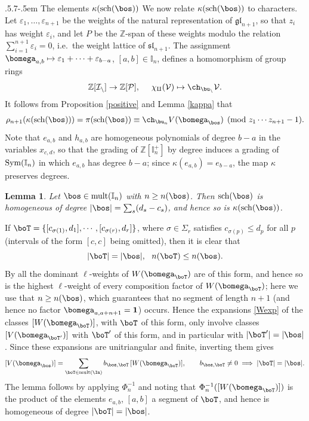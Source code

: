 \documentclass[11pt,reqno]{amsart}
\makeatletter
\newtheorem*{lem}{Lemma}
\theoremstyle{definition} \newtheorem*{defn}{Definition}
\theoremstyle{definition}
\newenvironment{pf}{\proof}{\endproof}
\numberwithin{equation}{section}
\newcommand{\lie}[1]{\mathfrak{#1}}
\def\subsection{\def\@secnumfont{\bfseries}\@startsection{subsection}{2}%
  {\parindent}{.5\linespacing\@plus.7\linespacing}{-.5em}%
  {\normalfont\bfseries}}
\def\mult{\operatorname{mult}}
\makeatother
\begin{document}
\subsection{The elements $\kappa({\rm sch}(\bos))$} We now relate $\kappa({\rm sch}(\bos))$ to characters. Let $\varepsilon_1,\dots,\varepsilon_{n+1}$ be the weights of the natural
representation of $\lie{gl}_{n+1}$, so that $z_i$ has weight $\varepsilon_i$, and let $P$ be the $\mathbb Z$-span of these weights
modulo the relation $\sum_{i=1}^{n+1}\varepsilon_i=0$, i.e.\ the weight lattice of $\lie{sl}_{n+1}$. The assignment
$\bomega_{a,b}\mapsto \varepsilon_1+\cdots+\varepsilon_{b-a}$, $[a,b]\in\mathbb I_n$, defines a
homomorphism of group rings $$\mathbb Z[\cal I_n]\to\mathbb Z[P], \ \ \ \ \chi_q(V)\mapsto 
\ch_{\bu_n}V.$$  It follows from Proposition \ref{positive} and Lemma
\ref{kappa} that
$$\rho_{n+1}(\kappa({\rm sch}(\bos)))=\pi({\rm sch}(\bos))\equiv\ch_{\bu_n}V(\bomega_\bos)\pmod{z_1\cdots z_{n+1}-1}.$$
\noindent Note that $e_{a,b}$ and $h_{a,b}$ are homogeneous polynomials of degree $b-a$ in the variables $x_{c,d}$, so that the
grading of $\mathbb Z[\mathbb I_n^+]$ by degree induces a grading of ${\rm Sym}(\mathbb I_n)$ in which $e_{a,b}$ has degree $b-a$; since
$\kappa(e_{a,b})=e_{b-a}$, the map $\kappa$ preserves degrees.
\begin{lem}\label{homog} Let $\bos\in{\rm mult}(\mathbb I_n)$ with $n\ge n(\bos)$. Then ${\rm sch}(\bos)$ is homogeneous of degree
$|\bos|=\sum_s(d_s-c_s)$, and hence so is $\kappa({\rm sch}(\bos))$.
\end{lem}
\begin{pf} If $\boT=\{[c_{\sigma(1)},d_1],\cdots,[c_{\sigma(r)},d_r]\}$, where $\sigma\in\Sigma_r$ satisfies $c_{\sigma(p)}\le d_p$ for all $p$ (intervals
of the form $[c,c]$ being omitted), then it is clear that $$|\boT|=|\bos|,\ \ n(\boT)\le n(\bos).$$
By \cite[Theorem 1(ii)]{BC25b} all the dominant $\ell$-weights of $W(\bomega_\boT)$ are of this form, and hence so is the
highest $\ell$-weight of every composition factor of $W(\bomega_\boT)$; here we use that $n\ge n(\bos)$, which guarantees that no
segment of length $n+1$ (and hence no factor $\bomega_{a,a+n+1}=\bold 1$) occurs. Hence the expansions \eqref{Wexp} of the
classes $[W(\bomega_\boT)]$, with $\boT$ of this form, only involve classes $[V(\bomega_{\boT'})]$ with $\boT'$ of this form, and in
particular with $|\boT'|=|\bos|$. Since these expansions are unitriangular and finite, inverting them gives
$$[V(\bomega_\bos)]=\sum_{\boT\in\mult(\In)}b_{\bos,\boT}\,[W(\bomega_\boT)],\qquad b_{\bos,\boT}\ne 0\implies |\boT|=|\bos|.$$
The lemma follows by applying $\Phi_n^{-1}$ and noting that $\Phi_n^{-1}([W(\bomega_\boT)])$ is the product of the elements $e_{a,b}$,
$[a,b]$ a segment of $\boT$, and hence is homogeneous of degree $|\boT|=|\bos|$.
\end{pf}
\end{document}
